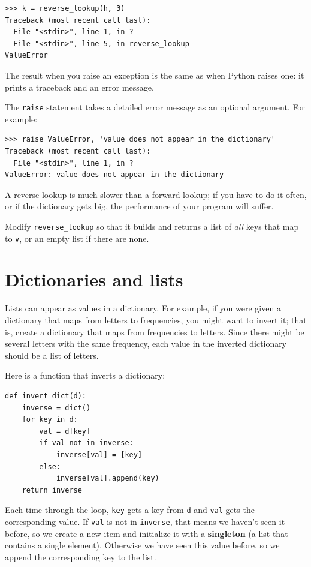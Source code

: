 \documentclass[10pt]{book}
\begin{document}
\begin{CJK}{UTF8}{gbsn}
\begin{verbatim}
>>> k = reverse_lookup(h, 3)
Traceback (most recent call last):
  File "<stdin>", line 1, in ?
  File "<stdin>", line 5, in reverse_lookup
ValueError
\end{verbatim}
%
The result when you raise an exception is the same as when
Python raises one: it prints a traceback and an error message.

The {\tt raise} statement takes a detailed error message as an
optional argument.  For example:

\begin{verbatim}
>>> raise ValueError, 'value does not appear in the dictionary'
Traceback (most recent call last):
  File "<stdin>", line 1, in ?
ValueError: value does not appear in the dictionary
\end{verbatim}
%
A reverse lookup is much slower than a forward lookup; if you
have to do it often, or if the dictionary gets big, the performance
of your program will suffer.

\begin{exercise}

Modify \verb"reverse_lookup" so that it builds and returns a list
of {\em all} keys that map to {\tt v}, or an empty list if there
are none.

\end{exercise}


\section{Dictionaries and lists}
\label{invert}

Lists can appear as values in a dictionary.  For example, if you
were given a dictionary that maps from letters to frequencies, you
might want to invert it; that is, create a dictionary that maps
from frequencies to letters.  Since there might be several letters
with the same frequency, each value in the inverted dictionary
should be a list of letters.

Here is a function that inverts a dictionary:

\begin{verbatim}
def invert_dict(d):
    inverse = dict()
    for key in d:
        val = d[key]
        if val not in inverse:
            inverse[val] = [key]
        else:
            inverse[val].append(key)
    return inverse
\end{verbatim}
%
Each time through the loop, {\tt key} gets a key from {\tt d} and 
{\tt val} gets the corresponding value.  If {\tt val} is not in {\tt inverse},
that means we haven't seen it before, so we create a new item and
initialize it with a {\bf singleton} (a list that contains a
single element).  Otherwise we have seen this value before, so we
append the corresponding key to the list.


\end{CJK}
\end{document}
